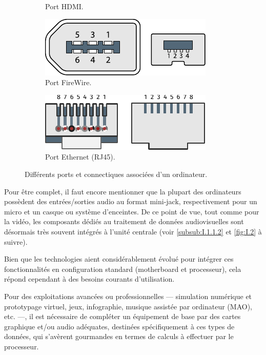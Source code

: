 \begin{figure}[!hb]
\begin{subfigure}[b]{0.35\linewidth}
		\caption{\label{fig:I.1d}Port HDMI.}
	\end{subfigure}\hfill
	\begin{subfigure}[b]{0.3\linewidth}\Centering
		\includegraphics[width=0.75\linewidth]{./Images/Chapter01/figI-01e-firewire.pdf}
		\caption{\label{fig:I.1e}Port FireWire.}
	\end{subfigure}\hfill
	\begin{subfigure}[b]{0.3\linewidth}\Centering
		\includegraphics[width=0.8\linewidth]{./Images/Chapter01/figI-01f-rj45-ethernet.pdf}
		\caption{\label{fig:I.1f}Port Ethernet (RJ45).}
	\end{subfigure}
	\caption{\label{fig:I.1}Différents ports et connectiques associées d'un ordinateur.}
\end{figure}

Pour être complet, il faut encore mentionner que la plupart des ordinateurs possèdent des entrées/sorties audio au format mini-jack, respectivement pour un micro et un casque ou système d'enceintes.
De ce point de vue, tout comme pour la vidéo, les composants dédiés au traitement de données audiovisuelles sont désormais très souvent intégrés à l'unité centrale (voir \cref{subsub:I.1.1.2} et \cref{fig:I.2} à suivre).

Bien que les technologies aient considérablement évolué pour intégrer ces fonctionnalités en configuration standard (\gls{motherboard} et processeur), cela répond cependant à des besoins courants d'utilisation. 

Pour des exploitations avancées ou professionnelles --- simulation numérique et prototypage virtuel, jeux, infographie, musique assistée par ordinateur (MAO), etc. ---, il est nécessaire de compléter un équipement de base par des cartes graphique et/ou audio adéquates, destinées spécifiquement à ces types de données, qui s'avèrent gourmandes en termes de calculs à effectuer par le processeur.


